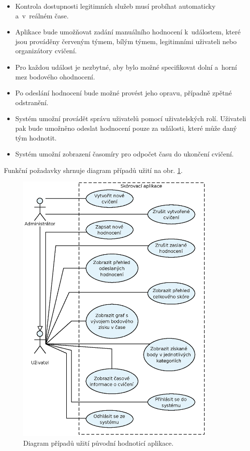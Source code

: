 \documentclass[
  digital,
  twoside,
  table, 
  nolof, 
  nolot
]{fithesis3}
\begin{document}
\begin{itemize}
\item Kontrola dostupnosti legitimních služeb musí probíhat automaticky a~v~reálném čase.
\item Aplikace bude umožňovat zadání manuálního hodnocení k~událostem, které jsou prováděny červeným týmem, bílým týmem, legitimními uživateli nebo organizátory cvičení.
\item Pro každou událost je nezbytné, aby bylo možné specifikovat dolní a~horní mez bodového ohodnocení.
\item Po odeslání hodnocení bude možné provést jeho opravu, případně zpětné odstranění.
\item Systém umožní provádět správu uživatelů pomocí uživatelských rolí. Uživateli pak bude umožněno odeslat hodnocení pouze za události, které může daný tým hodnotit.
\item Systém umožní zobrazení časomíry pro odpočet času do ukončení cvičení.
\end{itemize}

Funkční požadavky shrnuje diagram případů užití na obr. \ref{fig:useCase1}.

\begin{figure}[ht!]
    \centering
    \includegraphics[width=10cm]{images/Use-case-1.eps}
    \caption{Diagram případů užití původní hodnoticí aplikace.}
    \label{fig:useCase1}
\end{figure}
\end{document}
